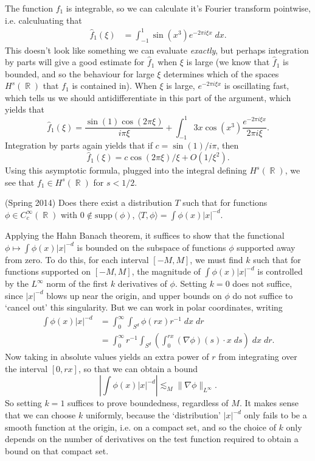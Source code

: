 \documentclass[answers]{exam}
\DeclareMathOperator{\RR}{\mathbb{R}}
\begin{document}
\begin{questions}
\begin{solution}
	The function $f_1$ is integrable, so we can calculate it's Fourier transform pointwise, i.e. calculuating that
	\begin{align*}
			\widehat{f}_1(\xi) &= \int_{-1}^1 \sin(x^3) e^{-2 \pi i \xi x}\; dx.
		\end{align*}
		This doesn't look like something we can evaluate \emph{exactly}, but perhaps integration by parts will give a good estimate for $\widehat{f}_1$ when $\xi$ is large (we know that $\widehat{f}_1$ is bounded, and so the behaviour for large $\xi$ determines which of the spaces $H^s(\RR)$ that $f_1$ is contained in). When $\xi$ is large, $e^{-2 \pi i \xi x}$ is oscillating fast, which tells us we should antidifferentiate in this part of the argument, which yields that
		\[ \widehat{f}_1(\xi) = \frac{\sin(1) \cos(2 \pi \xi)}{i \pi \xi} + \int_{-1}^1 3x \cos(x^3) \frac{e^{- 2\pi i \xi x}}{2 \pi i \xi}. \]
		Integration by parts again yields that if $c = \sin(1) / i \pi$, then
		\[ \widehat{f}_1(\xi) = c \cos(2 \pi \xi) / \xi + O(1/\xi^2). \]
		Using this asymptotic formula, plugged into the integral defining $H^s(\RR)$, we see that $f_1 \in H^s(\RR)$ for $s < 1/2$.
\end{solution}

\question (Spring 2014) Does there exist a distribution $T$ such that for functions $\phi \in C_c^\infty(\RR)$ with $0 \not \in \text{supp}(\phi)$, $\langle T, \phi \rangle = \int \phi(x) |x|^{-d}$.
\begin{solution}
		Applying the Hahn Banach theorem, it suffices to show that the functional $\phi \mapsto \int \phi(x) |x|^{-d}$ is bounded on the subspace of functions $\phi$ supported away from zero. To do this, for each interval $[-M,M]$, we must find $k$ such that for functions supported on $[-M,M]$, the magnitude of $\int \phi(x) |x|^{-d}$ is controlled by the $L^\infty$ norm of the first $k$ derivatives of $\phi$. Setting $k = 0$ does not suffice, since $|x|^{-d}$ blows up near the origin, and upper bounds on $\phi$ do not suffice to `cancel out' this singularity. But we can work in polar coordinates, writing
		\begin{align*}
				\int \phi(x) |x|^{-d} &= \int_0^\infty \int_{S^d} \phi( r x ) r^{-1}\; dx\; dr \\
				&= \int_0^\infty r^{-1} \int_{S^d} \left( \int_0^{rx} (\nabla \phi)(s) \cdot x\; ds \right)\; dx \;dr.
			\end{align*}
			Now taking in absolute values yields an extra power of $r$ from integrating over the interval $[0,rx]$, so that we can obtain a bound
			\[ \left| \int \phi(x) |x|^{-d} \right| \lesssim_M \| \nabla \phi \|_{L^\infty}. \]
			So setting $k = 1$ suffices to prove boundedness, regardless of $M$. It makes sense that we can choose $k$ uniformly, because the `distribution' $|x|^{-d}$ only fails to be a smooth function at the origin, i.e. on a compact set, and so the choice of $k$ only depends on the number of derivatives on the test function required to obtain a bound on that compact set.


\end{solution}
\end{questions}
\end{document}
